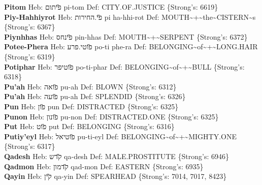 {\textbf{Pitom} Heb: {\large\H פיתום} pi-tom Def: CITY.OF.JUSTICE \{Strong's: 6619\}\hfill{}\\

\textbf{Piy-Hahhiyrot} Heb: {\large\H פי.החירות} pi ha-hhi-rot Def: MOUTH\textasciitilde{}+\textasciitilde{}the\textasciitilde{}CISTERN\textasciitilde{}s \{Strong's: 6367\}\hfill{}\\

\textbf{Piynhhas} Heb: {\large\H פינחס} pin-hhas Def: MOUTH\textasciitilde{}+\textasciitilde{}SERPENT \{Strong's: 6372\}\hfill{}\\

\textbf{Potee-Phera} Heb: {\large\H פוטי.פרע} po-ti phe-ra Def: BELONGING\textasciitilde{}of\textasciitilde{}+\textasciitilde{}LONG.HAIR \{Strong's: 6319\}\hfill{}\\

\textbf{Potiphar} Heb: {\large\H פוטיפר} po-ti-phar Def: BELONGING\textasciitilde{}of\textasciitilde{}+\textasciitilde{}BULL \{Strong's: 6318\}\hfill{}\\

\textbf{Pu'ah} Heb: {\large\H פואה} pu-ah Def: BLOWN \{Strong's: 6312\}\hfill{}\\

\textbf{Pu'ah} Heb: {\large\H פועה} pu-ah Def: SPLENDID \{Strong's: 6326\}\hfill{}\\

\textbf{Pun} Heb: {\large\H פון} pun Def: DISTRACTED \{Strong's: 6325\}\hfill{}\\

\textbf{Punon} Heb: {\large\H פונון} pu-non Def: DISTRACTED.ONE \{Strong's: 6325\}\hfill{}\\

\textbf{Put} Heb: {\large\H פוט} put Def: BELONGING \{Strong's: 6316\}\hfill{}\\

\textbf{Putiy'eyl} Heb: {\large\H פוטיאל} pu-ti-eyl Def: BELONGING\textasciitilde{}of\textasciitilde{}+\textasciitilde{}MIGHTY.ONE \{Strong's: 6317\}\hfill{}\\

\textbf{Qadesh} Heb: {\large\H קדש} qa-desh Def: MALE.PROSTITUTE \{Strong's: 6946\}\hfill{}\\

\textbf{Qadmon} Heb: {\large\H קדמון} qad-mon Def: EASTERN \{Strong's: 6935\}\hfill{}\\

\textbf{Qayin} Heb: {\large\H קין} qa-yin Def: SPEARHEAD \{Strong's: 7014, 7017, 8423\}\hfill{}\\

}
